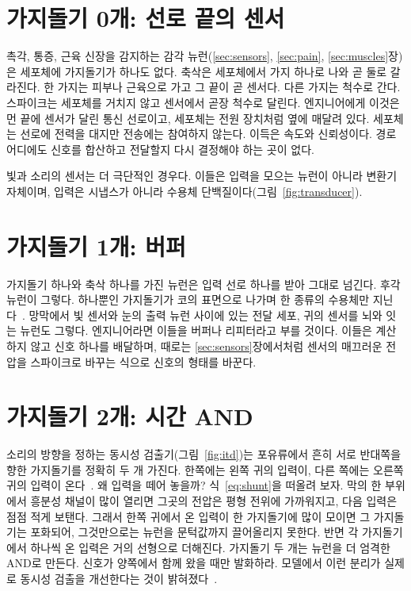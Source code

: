 \section{가지돌기 0개: 선로 끝의 센서}

촉각, 통증, 근육 신장을 감지하는 감각 뉴런(\ref{sec:sensors}, \ref{sec:pain}, \ref{sec:muscles}장)은 세포체에 가지돌기가 하나도 없다. 축삭은 세포체에서 가지 하나로 나와 곧 둘로 갈라진다. 한 가지는 피부나 근육으로 가고 그 끝이 곧 센서다. 다른 가지는 척수로 간다. 스파이크는 세포체를 거치지 않고 센서에서 곧장 척수로 달린다. 엔지니어에게 이것은 먼 끝에 센서가 달린 통신 선로이고, 세포체는 전원 장치처럼 옆에 매달려 있다. 세포체는 선로에 전력을 대지만 전송에는 참여하지 않는다. 이득은 속도와 신뢰성이다. 경로 어디에도 신호를 합산하고 전달할지 다시 결정해야 하는 곳이 없다.

빛과 소리의 센서는 더 극단적인 경우다. 이들은 입력을 모으는 뉴런이 아니라 변환기 자체이며, 입력은 시냅스가 아니라 수용체 단백질이다(그림~\ref{fig:transducer}).

\section{가지돌기 1개: 버퍼}

가지돌기 하나와 축삭 하나를 가진 뉴런은 입력 선로 하나를 받아 그대로 넘긴다. 후각 뉴런이 그렇다. 하나뿐인 가지돌기가 코의 표면으로 나가며 한 종류의 수용체만 지닌다~\cite{Mombaerts2004}. 망막에서 빛 센서와 눈의 출력 뉴런 사이에 있는 전달 세포, 귀의 센서를 뇌와 잇는 뉴런도 그렇다. 엔지니어라면 이들을 버퍼나 리피터라고 부를 것이다. 이들은 계산하지 않고 신호 하나를 배달하며, 때로는 \ref{sec:sensors}장에서처럼 센서의 매끄러운 전압을 스파이크로 바꾸는 식으로 신호의 형태를 바꾼다.

\section{가지돌기 2개: 시간 AND}

소리의 방향을 정하는 동시성 검출기(그림~\ref{fig:itd})는 포유류에서 흔히 서로 반대쪽을 향한 가지돌기를 정확히 두 개 가진다. 한쪽에는 왼쪽 귀의 입력이, 다른 쪽에는 오른쪽 귀의 입력이 온다~\cite{Grothe2010}. 왜 입력을 떼어 놓을까? 식~\eqref{eq:shunt}을 떠올려 보자. 막의 한 부위에서 흥분성 채널이 많이 열리면 그곳의 전압은 평형 전위에 가까워지고, 다음 입력은 점점 적게 보탠다. 그래서 한쪽 귀에서 온 입력이 한 가지돌기에 많이 모이면 그 가지돌기는 포화되어, 그것만으로는 뉴런을 문턱값까지 끌어올리지 못한다. 반면 각 가지돌기에서 하나씩 온 입력은 거의 선형으로 더해진다. 가지돌기 두 개는 뉴런을 더 엄격한 AND로 만든다. 신호가 양쪽에서 함께 왔을 때만 발화하라. 모델에서 이런 분리가 실제로 동시성 검출을 개선한다는 것이 밝혀졌다~\cite{AgmonSnir1998}.

